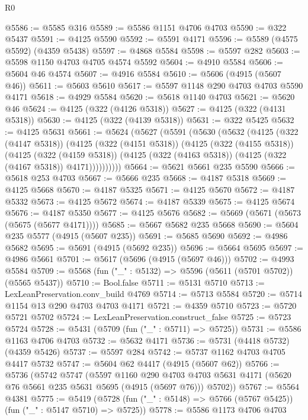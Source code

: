 \begin{lexlean}{R0}
\begin{coremodule}
@5586 := @5585 @316
@5589 := @5586 @1151 @4706 @4703
@5590 := @322 @5437
@5591 := @4125 @5590
@5592 := @5591 @4171
@5596 := @5589 (@4575 @5592) (@4359 @5438)
@5597 := @4868 @5584
@5598 := @5597 @282
@5603 := @5598 @1150 @4703 @4705 @4574 @5592
@5604 := @4910 @5584
@5606 := @5604 @46 @4574
@5607 := @4916 @5584
@5610 := @5606 (@4915 (@5607 @46))
@5611 := @5603 @5610
@5617 := @5597 @1148 @290 @4703 @4703 @5590 @4171
@5618 := @4929 @5584
@5620 := @5618 @1140 @4703
@5621 := @5620 @46
@5624 := @4125 (@322 (@4126 @5318))
@5627 := @4125 (@322 (@4131 @5318))
@5630 := @4125 (@322 (@4139 @5318))
@5631 := @322 @5425
@5632 := @4125 @5631
@5661 := @5624
    (@5627
      (@5591
        (@5630
          (@5632
            (@4125
              (@322 (@4147 @5318))
              (@4125
                (@322 (@4151 @5318))
                (@4125
                  (@322 (@4155 @5318))
                  (@4125
                    (@322 (@4159 @5318))
                    (@4125 (@322 (@4163 @5318)) (@4125 (@322 (@4167 @5318)) @4171))))))))))
@5664 := @5621 @5661 @235 @5590
@5666 := @5618 @253 @4703
@5667 := @5666 @235
@5668 := @4187 @5318
@5669 := @4125 @5668
@5670 := @4187 @5325
@5671 := @4125 @5670
@5672 := @4187 @5332
@5673 := @4125 @5672
@5674 := @4187 @5339
@5675 := @4125 @5674
@5676 := @4187 @5350
@5677 := @4125 @5676
@5682 := @5669 (@5671 (@5673 (@5675 (@5677 @4171))))
@5685 := @5667 @5682 @235 @5668
@5690 := @5604 @235 @5577 (@4915 (@5607 @235))
@5691 := @5685 @5690
@5692 := @4986 @5682
@5695 := @5691 (@4915 (@5692 @235))
@5696 := @5664 @5695
@5697 := @4986 @5661
@5701 := @5617 (@5696 (@4915 (@5697 @46)))
@5702 := @4993 @5584
@5709 := @5568 (fun ("_" : @5132) => @5596 (@5611 (@5701 @5702)) (@5565 @5437))
@5710 := Bool.false
@5711 := @5131 @5710
@5713 := LexLeanPreservation.conv_build @4769
@5714 := @5713 @5584
@5720 := @5714 @1154 @13 @290 @4703 @4703 @4171
@5721 := @4359 @5710
@5723 := @5720 @5721 @5702
@5724 := LexLeanPreservation.construct_false
@5725 := @5723 @5724
@5728 := @5431 (@5709 (fun ("_" : @5711) => @5725))
@5731 := @5586 @1163 @4706 @4703
@5732 := @5632 @4171
@5736 := @5731 (@4418 @5732) (@4359 @5426)
@5737 := @5597 @284
@5742 := @5737 @1162 @4703 @4705 @4417 @5732
@5747 := @5604 @62 @4417 (@4915 (@5607 @62))
@5766 := @5736
    (@5742
      @5747
      (@5597
        @1160
        @290
        @4703
        @4703
        @5631
        @4171
        (@5620 @76 @5661 @235 @5631 @5695 (@4915 (@5697 @76)))
        @5702))
@5767 := @5564 @4381
@5775 := @5419 (@5728 (fun ("_" : @5148) => @5766 (@5767 @5425)) (fun ("_" : @5147 @5710) => @5725))
@5778 := @5586 @1173 @4706 @4703

\end{coremodule}
\end{lexlean}
